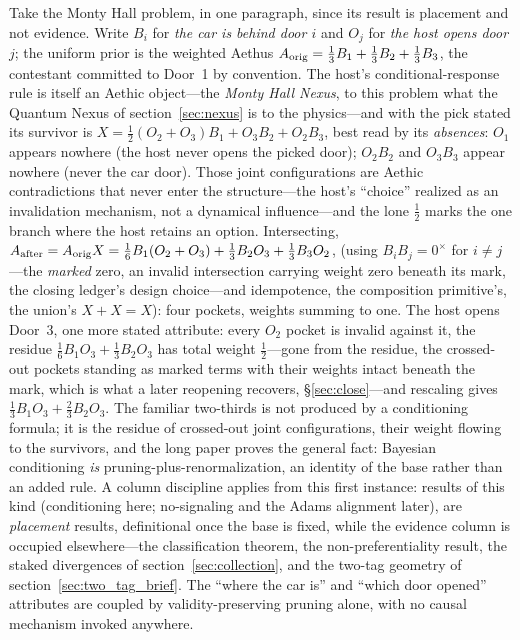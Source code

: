 \documentclass[11pt]{article}
\theoremstyle{definition}
\newcommand{\Aethus}{Aethus}
\begin{document}
Take the Monty Hall problem, in one paragraph, since its result is placement and not evidence. Write $B_i$ for \emph{the car is behind door $i$} and $O_j$ for \emph{the host opens door $j$}; the uniform prior is the weighted \Aethus{} $A_{\textnormal{orig}} = \tfrac13 B_1 + \tfrac13 B_2 + \tfrac13 B_3$, the contestant committed to Door~1 by convention. The host's conditional-response rule is itself an Aethic object---the \emph{Monty Hall Nexus}, to this problem what the Quantum Nexus of section~\ref{sec:nexus} is to the physics---and with the pick stated its survivor is $X = \tfrac12 (O_2 + O_3) B_1 + O_3 B_2 + O_2 B_3$, best read by its \emph{absences}: $O_1$ appears nowhere (the host never opens the picked door); $O_2 B_2$ and $O_3 B_3$ appear nowhere (never the car door). Those joint configurations are Aethic contradictions that never enter the structure---the host's ``choice'' realized as an invalidation mechanism, not a dynamical influence---and the lone $\tfrac12$ marks the one branch where the host retains an option. Intersecting, $A_{\textnormal{after}} = A_{\textnormal{orig}} X = \tfrac16 B_1 (O_2 + O_3) + \tfrac13 B_2 O_3 + \tfrac13 B_3 O_2$, (using $B_i B_j = 0^{\times}$ for $i \neq j$---the \emph{marked} zero, an invalid intersection carrying weight zero beneath its mark, the closing ledger's design choice---and idempotence, the composition primitive's, the union's $X + X = X$): four pockets, weights summing to one. The host opens Door~3, one more stated attribute: every $O_2$ pocket is invalid against it, the residue $\tfrac16 B_1 O_3 + \tfrac13 B_2 O_3$ has total weight $\tfrac12$---gone from the residue, the crossed-out pockets standing as marked terms with their weights intact beneath the mark, which is what a later reopening recovers, \S\ref{sec:close}---and rescaling gives $\tfrac13 B_1 O_3 + \tfrac23 B_2 O_3$. The familiar two-thirds is not produced by a conditioning formula; it is the residue of crossed-out joint configurations, their weight flowing to the survivors, and the long paper proves the general fact: Bayesian conditioning \emph{is} pruning-plus-renormalization, an identity of the base rather than an added rule. A column discipline applies from this first instance: results of this kind (conditioning here; no-signaling and the Adams alignment later), are \emph{placement} results, definitional once the base is fixed, while the evidence column is occupied elsewhere---the classification theorem, the non-preferentiality result, the staked divergences of section~\ref{sec:collection}, and the two-tag geometry of section~\ref{sec:two_tag_brief}. The ``where the car is'' and ``which door opened'' attributes are coupled by validity-preserving pruning alone, with no causal mechanism invoked anywhere.
\end{document}
